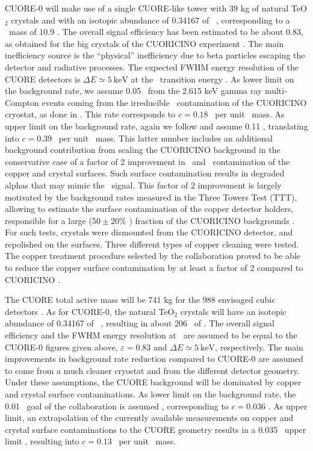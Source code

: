 CUORE-0 will make use of a single CUORE-like tower with 39 kg of natural TeO$_2$ crystals and with an isotopic abundance of 0.34167 of \TE\ \cite{CUORE:2011boi}, corresponding to a \bb\ mass of 10.9 \kgbb. The overall signal efficiency has been estimated to be about $0.83$, as obtained for the big crystals of the CUORICINO experiment \cite{Andreotti:2010vj}. The main inefficiency source is the ``physical'' inefficiency due to beta particles escaping the detector and radiative processes. The expected FWHM energy resolution of the CUORE detectors is $\Delta E\simeq 5\ \text{keV}$ at the \bbonu\ transition energy \cite{CUORE:2011boi}. As lower limit on the background rate, we assume 0.05 \ckky\ from the 2.615 keV gamma ray multi-Compton events coming from the irreducible \THORIUM\ contamination of the CUORICINO cryostat, as done in \cite{CUORE:2011boi}. This rate corresponds to $c=0.18$ \ckkbby\ per unit \bb\ mass. As upper limit on the background rate, again we follow \cite{CUORE:2011boi} and assume 0.11 \ckky, translating into $c=0.39$ \ckkbby\ per unit \bb\ mass. This latter number includes an additional background contribution from scaling the CUORICINO background in the conservative case of a factor of 2 improvement in \URANIUM\ and \THORIUM\ contamination of the copper and crystal surfaces. Such surface contamination results in degraded alphas that may mimic the \bb\ signal. This factor of 2 improvement is largely motivated by the background rates measured in the Three Towers Test (TTT), allowing to estimate the surface contamination of the copper detector holders, responsible for a large ($50\pm 20\%$ \cite{CUORE:2011boi}) fraction of the CUORICINO backgrounds \cite{Alessandria:2011vj}. For such tests, crystals were dismounted from the CUORICINO detector, and repolished on the surfaces. Three different types of copper cleaning were tested. The copper treatment procedure selected by the collaboration proved to be able to reduce the copper surface contamination by at least a factor of 2 compared to CUORICINO \cite{CUORE:2011boi,Alessandria:2011vj}.  

The CUORE total active mass will be 741 kg for the 988 envisaged cubic detectors \cite{CUORE:2011boi}. As for CUORE-0, the natural TeO$_2$ crystals will have an isotopic abundance of 0.34167 of \TE\ \cite{CUORE:2011boi}, resulting in about 206 \kgbb\ of \TE. The overall signal efficiency and the FWHM energy resolution at \Qbb\ are assumed to be equal to the CUORE-0 figures given above, $\varepsilon =0.83$ and $\Delta E\simeq 5\ \text{keV}$, respectively. The main improvements in background rate reduction compared to CUORE-0 are assumed to come from a much cleaner cryostat and from the different detector geometry. Under these assumptions, the CUORE background will be dominated by copper and crystal surface contaminations. As lower limit on the background rate, the 0.01 \ckky\ goal of the collaboration is assumed \cite{CUORE:2011boi,CUORE:2003fpg}, corresponding to $c=0.036$ \ckkbby. As upper limit, an extrapolation of the currently available measurements \cite{Alessandria:2011vj} on copper and crystal surface contaminations to the CUORE geometry results in a 0.035 \ckky\ upper limit \cite{Gorla:2012gd}, resulting into $c=0.13$ \ckkbby\ per unit \bb\ mass.  

